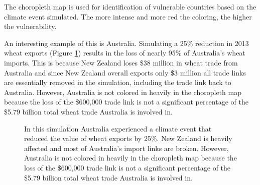 		The choropleth map is used for identification of vulnerable countries based on the climate event simulated. The more intense and more red the coloring, the higher the vulnerability. \par
		An interesting example of this is Australia. Simulating a 25\% reduction in 2013 wheat exports (Figure \ref{australia}) results in the loss of nearly 95\% of Australia's wheat imports. This is because New Zealand loses \$38 million in wheat trade from Australia and since New Zealand overall exports only \$3 million all trade links are essentially removed in the simulation, including the trade link back to Australia. However, Australia is not colored in heavily in the choropleth map because the loss of the \$600,000 trade link is not a significant percentage of the \$5.79 billion total wheat trade Australia is involved in.\par
		\begin{figure}[htb]
			\caption[CHOROPLETH MAP OF A SIMULATED AUSTRALIAN EXPORT REDUCTION]{In this simulation Australia experienced a climate event that reduced the value of wheat exports by 25\%. New Zealand is heavily affected and most of Australia's import links are broken. However, Australia is not colored in heavily in the choropleth map because the loss of the \$600,000 trade link is not a significant percentage of the \$5.79 billion total wheat trade Australia is involved in.}
			\label{australia}
		\end{figure}
